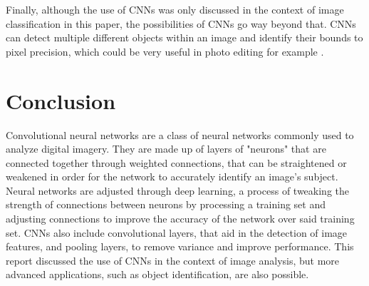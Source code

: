 \documentclass[12pt,a4paper,notitlepage]{article}
\begin{document}
Finally, although the use of CNNs was only discussed in the context of image classification in this paper, the possibilities of CNNs go way beyond that. CNNs can detect multiple different objects within an image and identify their bounds to pixel precision, which could be very useful in photo editing for example \cite{brownlee_gentle_2019}.

\section{Conclusion}
Convolutional neural networks are a class of neural networks commonly used to analyze digital imagery. They are made up of layers of "neurons" that are connected together through weighted connections, that can be straightened or weakened in order for the network to accurately identify an image's subject. Neural networks are adjusted through deep learning, a process of tweaking the strength of connections between neurons by processing a training set and adjusting connections to improve the accuracy of the network over said training set. CNNs also include convolutional layers, that aid in the detection of image features, and pooling layers, to remove variance and improve performance. This report discussed the use of CNNs in the context of image analysis, but more advanced applications, such as object identification, are also possible.

\clearpage
\begin{flushleft}


\end{flushleft}
\end{document}

